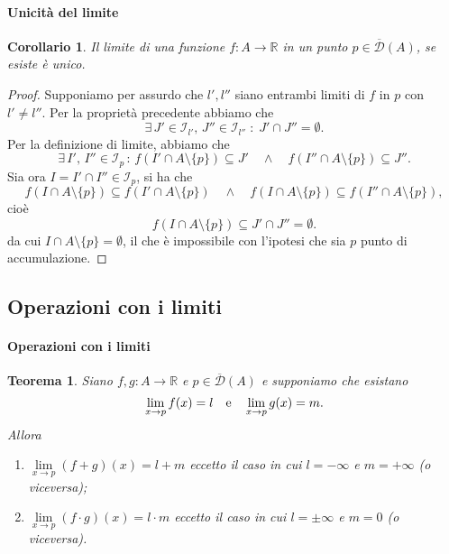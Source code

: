 \documentclass{article}
\theoremstyle{plain}
\newtheorem{thm}{Teorema}[section]
\newtheorem{cor}{Corollario}
\theoremstyle{definition}
\theoremstyle{remark}
\begin{document}
\paragraph{Unicità del limite}
\begin{bxthm}
\begin{cor}
    Il limite di una funzione $f:A\to\mathbb{R}$ in un punto $p\in\overline{\mathcal{D}}(A)$, se esiste è unico.
\end{cor}
\end{bxthm}
\begin{proof}
    Supponiamo per assurdo che $l',l''$ siano entrambi limiti di $f$ in $p$ con $l'\neq l''$.
    Per la proprietà precedente abbiamo che 
    \[\exists\,J'\in \mathcal{I}_{l'},\,J''\in \mathcal{I}_{l''}\;:\;J'\cap J''=\emptyset.\]
    Per la definizione di limite, abbiamo che
    \[\exists\,I',\,I''\in \mathcal{I}_p\,:\,f(I'\cap A\setminus\{p\})\subseteq J' \quad\land\quad f(I''\cap A\setminus\{p\})\subseteq J''.\]
    Sia ora $I=I'\cap I''\in \mathcal{I}_p$, si ha che 
    \[f(I\cap A\setminus\{p\})\subseteq f(I'\cap A\setminus\{p\})  \quad\land\quad f(I\cap A\setminus\{p\})\subseteq f(I''\cap A\setminus\{p\}),\]  
    cioè 
    \[f(I\cap A\setminus\{p\})\subseteq J'\cap J''=\emptyset.\]
    da cui $I\cap A\setminus\{p\}=\emptyset$, il che è impossibile con l'ipotesi che sia $p$ punto di accumulazione.
\end{proof}

\vspace{10pt}

\subsection{Operazioni con i limiti}

\vspace{10pt}

\paragraph{Operazioni con i limiti}
\begin{bxthm}
\begin{thm}
    Siano $f,g:A\to\mathbb{R}$ e $p\in\overline{\mathcal{D}}(A)$ e supponiamo che esistano
    \[\lim_{x\to p} f(x)=l\quad\textup{e}\quad\lim_{x\to p}g(x)=m.\]
    Allora 
    \begin{enumerate}
        \item $\lim\limits_{x\to p}(f+g)(x)=l+m$ eccetto il caso in cui $l=-\infty$ e $m=+\infty$ (o viceversa);
        \item $\lim\limits_{x\to p}(f\cdot g)(x)=l\cdot m$ eccetto il caso in cui $l=\pm\infty$ e $m=0$ (o viceversa).
    \end{enumerate}
\end{thm}
\end{bxthm}
\end{document}
